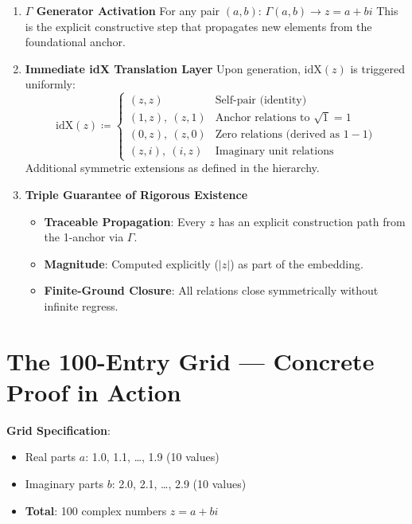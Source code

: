 \documentclass{article}
\begin{document}
\begin{enumerate}
    \item \textbf{$\Gamma$ Generator Activation}  
    For any pair $(a, b)$:  
    $\Gamma(a, b) \to z = a + bi$  
    This is the explicit constructive step that propagates new elements from the foundational anchor.

    \item \textbf{Immediate idX Translation Layer}  
    Upon generation, $\mathrm{idX}(z)$ is triggered uniformly:  
    \[
    \mathrm{idX}(z) \coloneqq
    \begin{cases}
    (z, z) & \text{Self-pair (identity)} \\
    (1, z),\ (z, 1) & \text{Anchor relations to }\sqrt{1}=1 \\
    (0, z),\ (z, 0) & \text{Zero relations (derived as }1-1\text{)} \\
    (z, i),\ (i, z) & \text{Imaginary unit relations}
    \end{cases}
    \]
    Additional symmetric extensions as defined in the hierarchy.

    \item \textbf{Triple Guarantee of Rigorous Existence}
    \begin{itemize}
        \item \textbf{Traceable Propagation}: Every $z$ has an explicit construction path from the 1-anchor via $\Gamma$.
        \item \textbf{Magnitude}: Computed explicitly ($\lvert z \rvert$) as part of the embedding.
        \item \textbf{Finite-Ground Closure}: All relations close symmetrically without infinite regress.
    \end{itemize}
\end{enumerate}

\section{The 100-Entry Grid --- Concrete Proof in Action}

\textbf{Grid Specification}:  
\begin{itemize}
    \item Real parts $a$: 1.0, 1.1, \dots, 1.9 (10 values)
    \item Imaginary parts $b$: 2.0, 2.1, \dots, 2.9 (10 values)
    \item \textbf{Total}: 100 complex numbers $z = a + bi$
\end{itemize}
\end{document}
